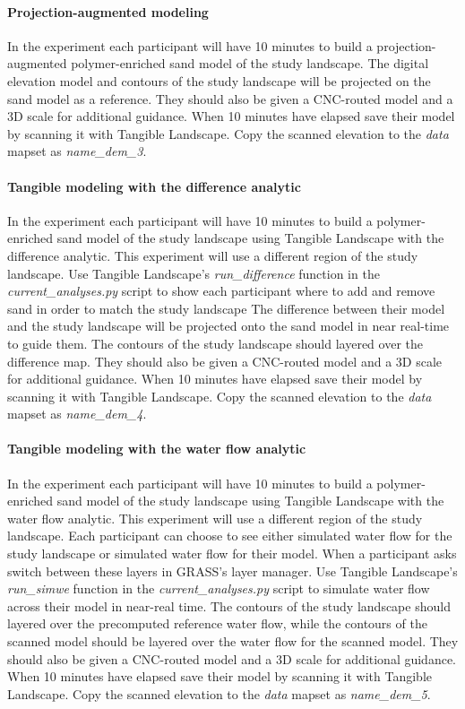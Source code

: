 \documentclass[prodmode,acmtochi]{acmsmall} %
\begin{document}
\paragraph{Projection-augmented modeling}
In the  experiment
each participant will have 10 minutes to build 
a projection-augmented polymer-enriched sand model
of the study landscape.
The digital elevation model and contours of the study landscape 
will be projected on the sand model as a reference. 
They should also be given a CNC-routed model 
and a 3D scale for additional guidance. 
%
When 10 minutes have elapsed 
save their model by scanning it with Tangible Landscape.
Copy the scanned elevation to the \emph{data} mapset
as \emph{name{\_}dem{\_}3}.

\paragraph{Tangible modeling with the difference analytic}
In the  experiment
each participant will have 10 minutes to build 
a polymer-enriched sand model
of the study landscape 
using Tangible Landscape with the difference analytic.
This experiment will use a different region of the study landscape. 
Use Tangible Landscape's \emph{run{\_}difference} function 
in the \emph{current{\_}analyses.py} script 
to show each participant where to add and remove sand 
in order to match the study landscape
The difference between their model and the study landscape
will be projected onto the sand model in near real-time
to guide them. 
The contours of the study landscape should layered
over the difference map. 
They should also be given a CNC-routed model 
and a 3D scale for additional guidance. 
%
When 10 minutes have elapsed 
save their model by scanning it with Tangible Landscape.
Copy the scanned elevation to the \emph{data} mapset
as \emph{name{\_}dem{\_}4}.

\paragraph{Tangible modeling with the water flow analytic}
In the  experiment
each participant will have 10 minutes to build 
a polymer-enriched sand model
of the study landscape 
using Tangible Landscape with the water flow analytic.
This experiment will use a different region of the study landscape. 
Each participant can choose to see either
simulated water flow for the study landscape
or simulated water flow for their model. 
When a participant asks
switch between these layers 
in GRASS's layer manager. 
Use Tangible Landscape's \emph{run{\_}simwe} function 
in the \emph{current{\_}analyses.py} script 
to simulate water flow across their model in near-real time.
The contours of the study landscape should layered
over the precomputed reference water flow, 
while the contours of the scanned model should be layered
over the water flow for the scanned model. 
They should also be given a CNC-routed model 
and a 3D scale for additional guidance. 
%
When 10 minutes have elapsed 
save their model by scanning it with Tangible Landscape.
Copy the scanned elevation to the \emph{data} mapset
as \emph{name{\_}dem{\_}5}.
\end{document}
